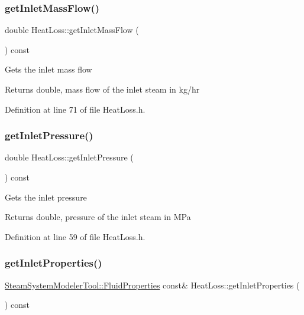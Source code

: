 \subsubsection{\texorpdfstring{get\+Inlet\+Mass\+Flow()}{getInletMassFlow()}}
{\footnotesize\ttfamily double Heat\+Loss\+::get\+Inlet\+Mass\+Flow (\begin{DoxyParamCaption}{ }\end{DoxyParamCaption}) const\hspace{0.3cm}{\ttfamily [inline]}}

Gets the inlet mass flow \begin{DoxyReturn}{Returns}
double, mass flow of the inlet steam in kg/hr 
\end{DoxyReturn}


Definition at line 71 of file Heat\+Loss.\+h.

\mbox{\label{class_heat_loss_a09e6e05477fd6794ea7f42bb43da2f50}} 
\subsubsection{\texorpdfstring{get\+Inlet\+Pressure()}{getInletPressure()}}
{\footnotesize\ttfamily double Heat\+Loss\+::get\+Inlet\+Pressure (\begin{DoxyParamCaption}{ }\end{DoxyParamCaption}) const\hspace{0.3cm}{\ttfamily [inline]}}

Gets the inlet pressure \begin{DoxyReturn}{Returns}
double, pressure of the inlet steam in M\+Pa 
\end{DoxyReturn}


Definition at line 59 of file Heat\+Loss.\+h.

\mbox{\label{class_heat_loss_a7bea461460dbacf1855d5375bbf6c097}} 
\subsubsection{\texorpdfstring{get\+Inlet\+Properties()}{getInletProperties()}}
{\footnotesize\ttfamily \hyperlink{struct_steam_system_modeler_tool_1_1_fluid_properties}{Steam\+System\+Modeler\+Tool\+::\+Fluid\+Properties} const\& Heat\+Loss\+::get\+Inlet\+Properties (\begin{DoxyParamCaption}{ }\end{DoxyParamCaption}) const\hspace{0.3cm}{\ttfamily [inline]}}


